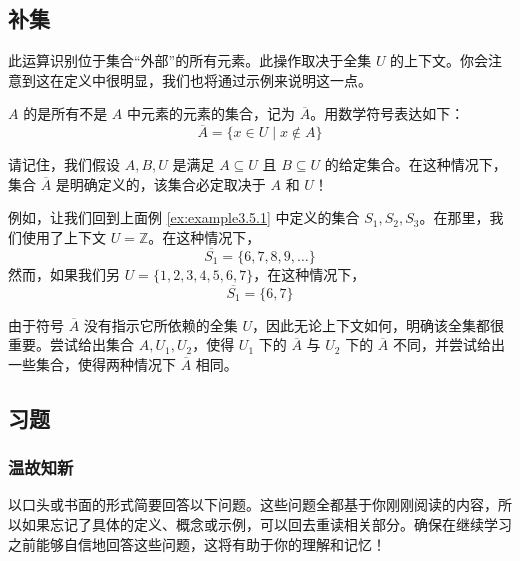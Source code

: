 \subsection{补集}

此运算识别位于集合``外部''的所有元素。此操作取决于全集 $U$ 的上下文。你会注意到这在定义中很明显，我们也将通过示例来说明这一点。

\begin{definition}
    $A$ 的是所有不是 $A$ 中元素的元素的集合，记为 $\overline{A}$。用数学符号表达如下：
    \[\overline{A} = \{x \in U \mid x \notin A\}\]
\end{definition}

请记住，我们假设 $A,B,U$ 是满足 $A \subseteq U$ 且 $B \subseteq U$ 的给定集合。在这种情况下，集合 $\overline{A}$ 是明确定义的，该集合必定取决于 $A$ 和 $U$！\\

\begin{example}
    例如，让我们回到上面例 \ref{ex:example3.5.1} 中定义的集合 $S_1, S_2, S_3$。在那里，我们使用了上下文 $U = \mathbb{Z}$。在这种情况下，
    \[\overline{S_1} = \{6, 7, 8, 9, \dots \}\]
    然而，如果我们另 $U = \{1, 2, 3, 4, 5, 6, 7\}$，在这种情况下，
    \[\overline{S_1} = \{6, 7\}\]
\end{example}

由于符号 $\overline{A}$ 没有指示它所依赖的全集 $U$，因此无论上下文如何，明确该全集都很重要。尝试给出集合 $A, U_1, U_2$，使得 $U_1$ 下的 $\overline{A}$ 与 $U_2$ 下的 $\overline{A}$ 不同，并尝试给出一些集合，使得两种情况下 $\overline{A}$ 相同。

\subsection{习题}

\subsubsection*{温故知新}

以口头或书面的形式简要回答以下问题。这些问题全都基于你刚刚阅读的内容，所以如果忘记了具体的定义、概念或示例，可以回去重读相关部分。确保在继续学习之前能够自信地回答这些问题，这将有助于你的理解和记忆！

